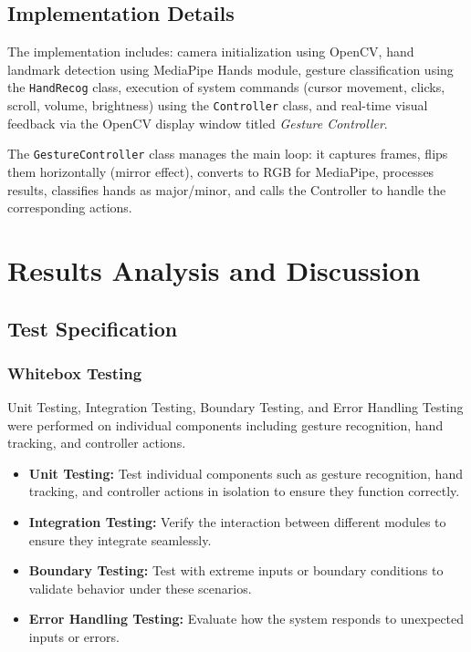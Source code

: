 \documentclass[12pt,a4paper]{report}
\begin{document}
\section{Implementation Details}

The implementation includes: camera initialization using OpenCV, hand landmark detection using
MediaPipe Hands module, gesture classification using the \texttt{HandRecog} class, execution
of system commands (cursor movement, clicks, scroll, volume, brightness) using the
\texttt{Controller} class, and real-time visual feedback via the OpenCV display window titled
\textit{Gesture Controller}.

The \texttt{GestureController} class manages the main loop: it captures frames, flips them
horizontally (mirror effect), converts to RGB for MediaPipe, processes results, classifies
hands as major/minor, and calls the Controller to handle the corresponding actions.

\chapter{Results Analysis and Discussion}

\section{Test Specification}

\subsection{Whitebox Testing}

Unit Testing, Integration Testing, Boundary Testing, and Error Handling Testing were performed
on individual components including gesture recognition, hand tracking, and controller actions.

\begin{itemize}[noitemsep]
  \item \textbf{Unit Testing:} Test individual components such as gesture recognition, hand
    tracking, and controller actions in isolation to ensure they function correctly.
  \item \textbf{Integration Testing:} Verify the interaction between different modules to
    ensure they integrate seamlessly.
  \item \textbf{Boundary Testing:} Test with extreme inputs or boundary conditions to validate
    behavior under these scenarios.
  \item \textbf{Error Handling Testing:} Evaluate how the system responds to unexpected inputs
    or errors.
\end{itemize}
\end{document}
